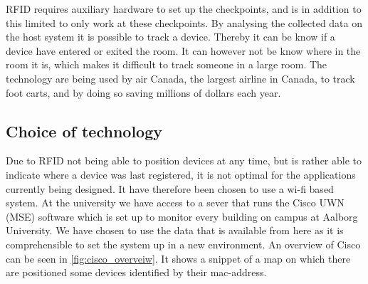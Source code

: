 RFID requires auxiliary hardware to set up the checkpoints, and is in addition to this limited to only work at these checkpoints. By analysing the collected data on the host system it is possible to track a device. Thereby it can be know if a device have entered or exited the room. It can however not be know where in the room it is, which makes it difficult to track someone in a large room.
The technology are being used by air Canada, the largest airline in Canada, to track foot carts, and by doing so saving millions of dollars each year\cite{RFIDjournal}.




\subsection{Choice of technology}\label{subsec:cisco}
Due to RFID not being able to position devices at any time, but is rather able to indicate where a device was last registered, it is not optimal for the applications currently being designed. It have therefore been chosen to use a wi-fi based system.
At the university we have access to a sever that runs the Cisco UWN (MSE) software which is set up to monitor every building on campus at Aalborg University. We have chosen to use the data that is available from here as it is comprehensible to set the system up in a new environment. An overview of Cisco can be seen in \cref{fig:cisco_overveiw}. It shows a snippet of a map on which there are positioned some devices identified by their mac-address.

